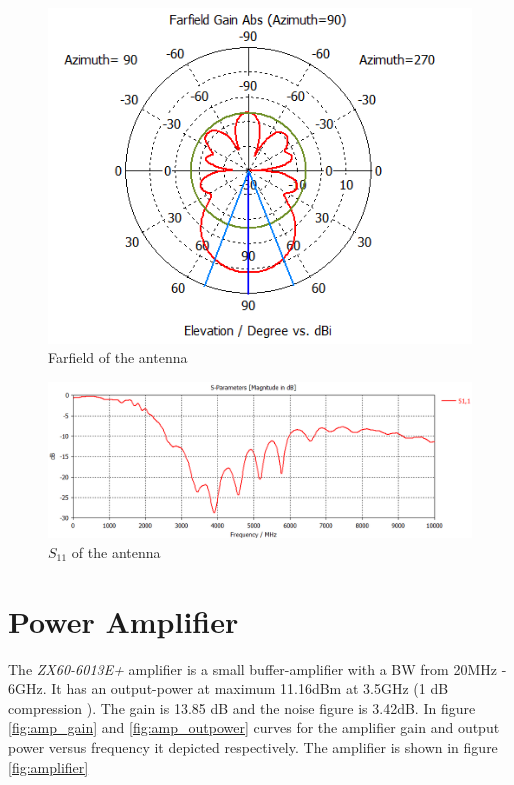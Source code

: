 \begin{figure}[H]
\centering 
\includegraphics[scale = 0.7]{figures/measurement/antenna_ff.png}
\caption{Farfield of the antenna}
\label{fig:ant_ff}
\end{figure} 


\begin{figure}[H]
\centering 
\includegraphics[scale = 0.6]{figures/measurement/antenna_spar.png}
\caption{$S_{11}$ of the antenna}
\label{fig:ant_spar}
\end{figure} 


\section{Power Amplifier}
The  \textit{ZX60-6013E+} amplifier is a small buffer-amplifier with a BW from 20MHz - 6GHz. It has an output-power at maximum 11.16dBm at 3.5GHz (1 dB compression ). The gain is 13.85 dB and the noise figure is 3.42dB. In figure \ref{fig:amp_gain} and \ref{fig:amp_outpower} curves for the amplifier gain and output power versus frequency it depicted respectively. The amplifier is shown in figure \ref{fig:amplifier} 

